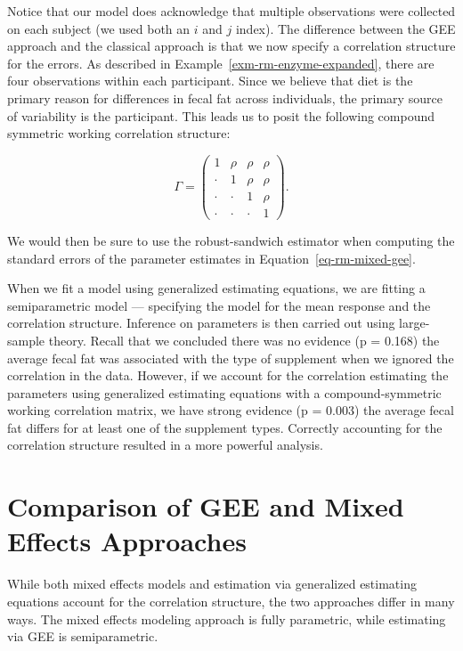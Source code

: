 \documentclass[
  letterpaper,
  DIV=11,
  numbers=noendperiod]{scrreprt}
\theoremstyle{definition}
\theoremstyle{definition}
\theoremstyle{remark}
\begin{document}
Notice that our model does acknowledge that multiple observations were
collected on each subject (we used both an \(i\) and \(j\) index). The
difference between the GEE approach and the classical approach is that
we now specify a correlation structure for the errors. As described in
Example~\ref{exm-rm-enzyme-expanded}, there are four observations within
each participant. Since we believe that diet is the primary reason for
differences in fecal fat across individuals, the primary source of
variability is the participant. This leads us to posit the following
compound symmetric working correlation structure:

\[\Gamma = \begin{pmatrix} 1 & \rho & \rho & \rho \\
\cdot & 1 & \rho & \rho \\
\cdot & \cdot & 1 & \rho \\
\cdot & \cdot & \cdot & 1 \end{pmatrix}.\]

We would then be sure to use the robust-sandwich estimator when
computing the standard errors of the parameter estimates in
Equation~\ref{eq-rm-mixed-gee}.

When we fit a model using generalized estimating equations, we are
fitting a semiparametric model --- specifying the model for the mean
response and the correlation structure. Inference on parameters is then
carried out using large-sample theory. Recall that we concluded there
was no evidence (p = 0.168) the average fecal fat was associated with
the type of supplement when we ignored the correlation in the data.
However, if we account for the correlation estimating the parameters
using generalized estimating equations with a compound-symmetric working
correlation matrix, we have strong evidence (p = 0.003) the average
fecal fat differs for at least one of the supplement types. Correctly
accounting for the correlation structure resulted in a more powerful
analysis.

\hypertarget{comparison-of-gee-and-mixed-effects-approaches}{%
\section{Comparison of GEE and Mixed Effects
Approaches}\label{comparison-of-gee-and-mixed-effects-approaches}}

While both mixed effects models and estimation via generalized
estimating equations account for the correlation structure, the two
approaches differ in many ways. The mixed effects modeling approach is
fully parametric, while estimating via GEE is semiparametric.
\end{document}
